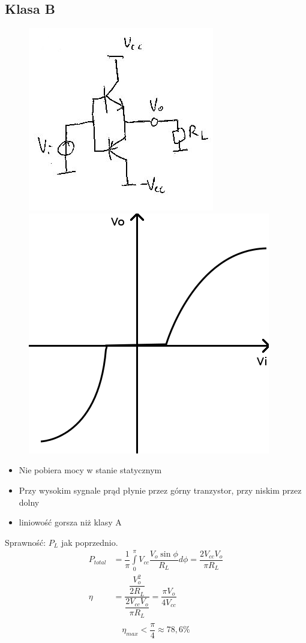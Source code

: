 \documentclass[10pt,a4paper]{article}
\begin{document}
\subsection{Klasa B}
\begin{figure}[H]
\centering
\includegraphics[scale=1]{wzm_moc_b}
\includegraphics[scale=0.5]{wzm_moc_b_wyk}
\end{figure}
\begin{itemize}
\item{Nie pobiera mocy w stanie statycznym}
\item{Przy wysokim sygnale prąd płynie przez górny tranzystor, przy niskim przez dolny}
\item{liniowość gorsza niż klasy A}
\end{itemize}

Sprawność:
$P_L$ jak poprzednio.
\begin{align*}
P_{total} &= \dfrac{1}{\pi} \int \limits^\pi_0 V_{cc} \dfrac{V_o \sin \phi}{R_L} d\phi = \dfrac{2 V_{cc} V_o}{\pi R_L}\\
\eta &= \dfrac{\dfrac{V_o^2}{2 R_L}}{\dfrac{2 V_{cc} V_o}{\pi R_L}} = \dfrac{\pi V_o}{4 V_{cc}}\\
\end{align*}
\begin{equation}
\eta_{max} < \dfrac{\pi}{4} \approx 78,6\%
\end{equation}
\end{document}
